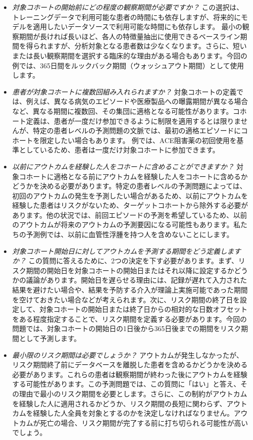 \documentclass[
  11pt]{book}
\theoremstyle{definition}
\theoremstyle{definition}
\theoremstyle{definition}
\theoremstyle{definition}
\theoremstyle{remark}
\begin{document}
\begin{itemize}
\item
  \emph{対象コホートの開始前にどの程度の観察期間が必要ですか？} この選択は、トレーニングデータで利用可能な患者の時間にも依存しますが、将来的にモデルを適用したいデータソースで利用可能な時間にも依存します。 最小の観察期間が長ければ長いほど、各人の特徴量抽出に使用できるベースライン期間を得られますが、分析対象となる患者数は少なくなります。さらに、短いまたは長い観察期間を選択する臨床的な理由がある場合もあります。今回の例では、365日間をルックバック期間（ウォッシュアウト期間）として使用します。
\item
  \emph{患者が対象コホートに複数回組み入れられますか？} 対象コホートの定義では、例えば、異なる病気のエピソードや医療製品への曝露期間が異なる場合など、異なる期間に複数回、その集団に適格となる可能性があります。コホート定義は、患者が一度だけ参加できるように制限を適用するとは限りませんが、特定の患者レベルの予測問題の文脈では、最初の適格エピソードにコホートを限定したい場合もあります。 例では、ACE阻害薬の初回使用を基準としているため、患者は一度だけ対象コホートに参加できます。
\item
  \emph{以前にアウトカムを経験した人をコホートに含めることができますか？} 対象コホートに適格となる前にアウトカムを経験した人をコホートに含めるかどうかを決める必要があります。特定の患者レベルの予測問題によっては、初回のアウトカムの発生を予測したい場合があるため、以前にアウトカムを経験した患者はリスクがないため、ターゲットコホートから除外する必要があります。他の状況では、前回エピソードの予測を希望しているため、以前のアウトカムが将来のアウトカムの予測要因になる可能性もあります。私たちの予測例では、以前に血管性浮腫を持つ人を含めないことにします。
\item
  \emph{対象コホート開始日に対してアウトカムを予測する期間をどう定義しますか？} この質問に答えるために、2つの決定を下す必要があります。まず、リスク期間の開始日を対象コホートの開始日またはそれ以降に設定するかどうかの議論があります。開始日を遅らせる理由には、記録が遅れて入力された結果を避けたい場合や、結果を予防する介入が理論上実施可能であった期間を空けておきたい場合などが考えられます。次に、リスク期間の終了日を設定して、対象コホートの開始日または終了日からの相対的な日数オフセットをある程度指定することで、リスク期間を定義する必要があります。今回の問題では、対象コホートの開始日の1日後から365日後までの期間をリスク期間として予測します。
\item
  \emph{最小限のリスク期間は必要でしょうか？} アウトカムが発生しなかったが、リスク期間終了前にデータベースを離脱した患者を含めるかどうかを決める必要があります。これらの患者は観察期間が終わった後にアウトカムを経験する可能性があります。この予測問題では、この質問に「はい」と答え、その理由で最小のリスク期間を必要とします。さらに、この制約がアウトカムを経験した人に適用されるかどうか、リスク期間の長短に関わらず、アウトカムを経験した人全員を対象とするのかを決定しなければなりません。アウトカムが死亡の場合、リスク期間が完了する前に打ち切られる可能性が高いでしょう。
\end{itemize}
\end{document}
